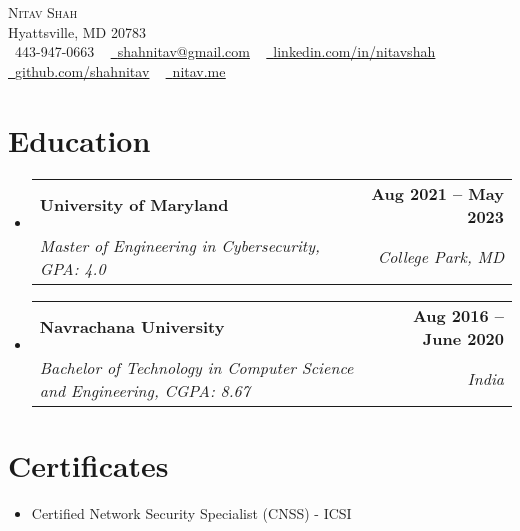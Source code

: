 \documentclass[letterpaper,11pt]{article}
\makeatletter
\newcommand{\resumeSubheading}[4]{
  \vspace{-2pt}\item
    \begin{tabular*}{1.0\textwidth}[t]{l@{\extracolsep{\fill}}r}
      \textbf{#1} & \textbf{\small #2} \\
      \textit{\small#3} & \textit{\small #4} \\
    \end{tabular*}\vspace{-7pt}
}
\newcommand{\resumeSubHeadingListStart}{\begin{itemize}[leftmargin=0.0in, label={}]}
\newcommand{\resumeSubHeadingListEnd}{\end{itemize}}
\makeatother
\begin{document}
\begin{center}
    {\Huge \scshape Nitav Shah} \\ \vspace{1pt}
    Hyattsville, MD 20783 \\ \vspace{1pt}
    \small \raisebox{-0.1\height}\faPhone\ 443-947-0663 ~ \href{mailto:shahnitav@gmail.com}{\raisebox{-0.2\height}\faEnvelope\  \underline{shahnitav@gmail.com}} ~ 
    \href{https://linkedin.com/in/nitavshah/}{\raisebox{-0.2\height}\faLinkedin\ \underline{linkedin.com/in/nitavshah}}  ~
    \href{https://github.com/shahnitav}{\raisebox{-0.2\height}\faGithub\ \underline{github.com/shahnitav}}  ~
    \href{https://nitav.me}{\raisebox{-0.2\height}\faGlobe\
    \underline{nitav.me}}
    \vspace{-8pt}
\end{center}


\section{Education}
  \resumeSubHeadingListStart
    \resumeSubheading
      {University of Maryland}{Aug 2021 -- May 2023}
      {Master of Engineering in Cybersecurity, GPA: 4.0}{College Park, MD}
  \resumeSubHeadingListEnd
  
  \resumeSubHeadingListStart
    \resumeSubheading
      {Navrachana University}{Aug 2016 -- June 2020}
      {Bachelor of Technology in Computer Science and Engineering, CGPA: 8.67}{India}
  \resumeSubHeadingListEnd
  
\section{Certificates}
        \begin{itemize}
            \item Certified Network Security Specialist (CNSS) - ICSI
        \end{itemize}
\vspace{-16pt}

\end{document}

